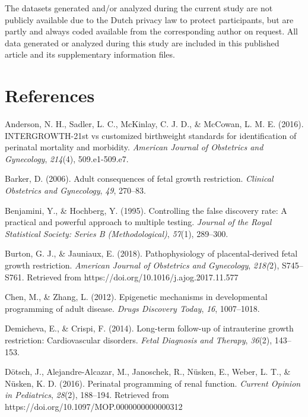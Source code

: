 \documentclass[authordate, empirical]{jote-new-article}
\begin{document}
	The datasets generated and/or analyzed during the current study are not publicly available due to the Dutch privacy law to protect participants, but are partly and always coded available from the corresponding author on request. All data generated or analyzed during this study are included in this published article and its supplementary information files.



	\section{References }



	Anderson, N. H., Sadler, L. C., McKinlay, C. J. D., \& McCowan, L. M. E. (2016). INTERGROWTH-21st vs customized birthweight standards for identification of perinatal mortality and morbidity. \emph{American Journal of Obstetrics and Gynecology}, \emph{214}(4), 509.e1-509.e7.



	Barker, D. (2006). Adult consequences of fetal growth restriction. \emph{Clinical Obstetrics and Gynecology}, \emph{49}, 270--83.



	Benjamini, Y., \& Hochberg, Y. (1995). Controlling the false discovery rate: A practical and powerful approach to multiple testing. \emph{Journal of the Royal Statistical Society: Series B (Methodological)}, \emph{57}(1), 289--300.



	Burton, G. J., \& Jauniaux, E. (2018). Pathophysiology of placental-derived fetal growth restriction. \emph{American Journal of Obstetrics and Gynecology}, \emph{218(}2), S745--S761. Retrieved from https://doi.org/10.1016/j.ajog.2017.11.577



	Chen, M., \& Zhang, L. (2012). Epigenetic mechanisms in developmental programming of adult disease. \emph{Drugs Discovery Today}, \emph{16}, 1007--1018.



	Demicheva, E., \& Crispi, F. (2014). Long-term follow-up of intrauterine growth restriction: Cardiovascular disorders. \emph{Fetal Diagnosis and Therapy}, \emph{36}(2), 143--153.



	Dötsch, J., Alejandre-Alcazar, M., Janoschek, R., Nüsken, E., Weber, L. T., \& Nüsken, K. D. (2016). Perinatal programming of renal function. \emph{Current Opinion in Pediatrics}, \emph{28}(2), 188--194. Retrieved from https://doi.org/10.1097/MOP.0000000000000312
\end{document}
